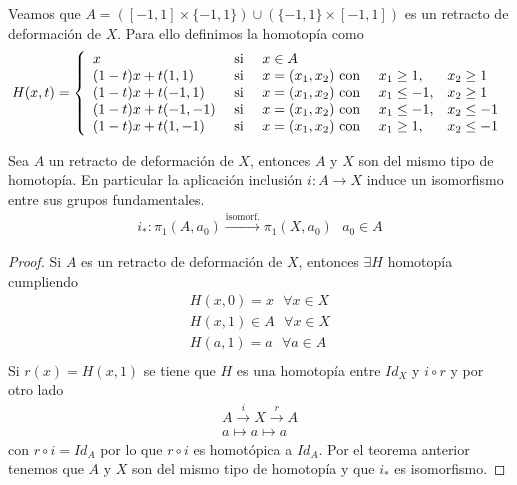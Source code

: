 \begin{ejemplo}
\begin{enumerate}
\begin{figure}[H]
\begin{tikzpicture}[scale=0.8]
            \end{tikzpicture}
        \end{figure}

        Veamos que $A=([-1,1]\times \{-1,1\})\cup (\{-1,1\}\times [-1,1])$ es un retracto de deformación de $X$. Para ello definimos la homotopía como 
        \begin{gather*}
            H(x,t) = \left\{
                \begin{array}{l c l l l }
                    x & \text{ si } & x\in A\\
                    (1-t)x+t(1,1) & \text{ si } & x=(x_1,x_2)\text{ con } &x_1\geq 1,& x_2\geq 1 \\
                    (1-t)x+t(-1,1) & \text{ si } & x=(x_1,x_2)\text{ con } &x_1\leq -1,& x_2\geq 1 \\
                    (1-t)x+t(-1,-1) & \text{ si } & x=(x_1,x_2)\text{ con } &x_1\leq - 1,& x_2\leq -1 \\
                    (1-t)x+t(1,-1) & \text{ si } & x=(x_1,x_2)\text{ con } &x_1\geq 1,& x_2\leq -1 \\
                \end{array}
            \right.
        \end{gather*}
    \end{enumerate}
\end{ejemplo}

\begin{coro}
    Sea $A$ un retracto de deformación de $X$, entonces $A$ y $X$ son del mismo tipo de homotopía. En particular la aplicación inclusión $i:A\to X$ induce un isomorfismo entre sus grupos fundamentales.
    \begin{gather*}
        i_*:\pi_1(A,a_0) \overset{\text{isomorf.}}{\longrightarrow} \pi_1(X,a_0)\ \ \ a_0\in A
    \end{gather*}
    \begin{proof}
        Si $A$ es un retracto de deformación de $X$, entonces $\exists H$ homotopía cumpliendo
        \begin{gather*}
            H(x,0) = x \ \ \ \forall x \in X\\
            H(x,1) \in A \ \ \ \forall x \in X\\
            H(a,1) = a \ \ \ \forall a\in A\\
        \end{gather*}
        Si $r(x)=H(x,1)$ se tiene  que $H$ es una homotopía entre $Id_X$ y $i \circ r$ y por otro lado
        \begin{gather*}
            A \overset{i}{\to} X \overset{r}{\to} A\\
            a \mapsto a \mapsto a
        \end{gather*}
        con $r\circ i=Id_A$ por lo que $r\circ i$ es homotópica a $Id_A$. Por el teorema anterior tenemos que $A$ y $X$ son del mismo tipo de homotopía y que $i_*$ es isomorfismo.
    \end{proof}
\end{coro}

